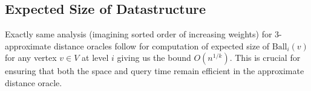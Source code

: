 \documentclass{article}
\begin{document}



\subsection{Expected Size of Datastructure}

Exactly same analysis (imagining sorted order of increasing weights) for 3-approximate distance oracles follow for computation of expected size of \(\text{Ball}_i(v)\) for any vertex \(v \in V\) at level \(i\) giving us the bound \(O(n^{1/k})\). This is crucial for ensuring that both the space and query time remain efficient in the approximate distance oracle.
\end{document}
